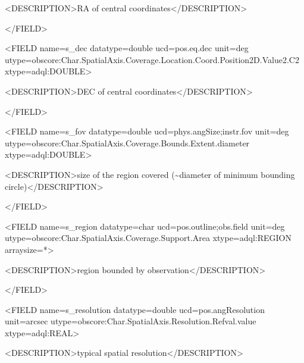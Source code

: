 \documentclass[11pt,a4paper]{ivoa}
\begin{document}
 {\textless}DESCRIPTION{\textgreater}RA of central coordinates{\textless}/DESCRIPTION{\textgreater}

{\textless}/FIELD{\textgreater}

{\textless}FIELD name={\textquotedbl}s\_dec{\textquotedbl} datatype={\textquotedbl}double{\textquotedbl}
ucd={\textquotedbl}pos.eq.dec{\textquotedbl} unit={\textquotedbl}deg{\textquotedbl}
utype={\textquotedbl}obscore:Char.SpatialAxis.Coverage.Location.Coord.Position2D.Value2.C2{\textquotedbl}
xtype={\textquotedbl}adql:DOUBLE{\textquotedbl}{\textgreater}

 {\textless}DESCRIPTION{\textgreater}DEC of central coordinates{\textless}/DESCRIPTION{\textgreater}

{\textless}/FIELD{\textgreater}

{\textless}FIELD name={\textquotedbl}s\_fov{\textquotedbl} datatype={\textquotedbl}double{\textquotedbl}
ucd={\textquotedbl}phys.angSize;instr.fov{\textquotedbl} unit={\textquotedbl}deg{\textquotedbl}
utype={\textquotedbl}obscore:Char.SpatialAxis.Coverage.Bounds.Extent.diameter{\textquotedbl}
xtype={\textquotedbl}adql:DOUBLE{\textquotedbl}{\textgreater}

{\textless}DESCRIPTION{\textgreater}size of the region covered (\~{}diameter of minimum bounding
circle){\textless}/DESCRIPTION{\textgreater}

{\textless}/FIELD{\textgreater}

{\textless}FIELD name={\textquotedbl}s\_region{\textquotedbl} datatype={\textquotedbl}char{\textquotedbl}
ucd={\textquotedbl}pos.outline;obs.field{\textquotedbl} unit={\textquotedbl}deg{\textquotedbl}
utype={\textquotedbl}obscore:Char.SpatialAxis.Coverage.Support.Area{\textquotedbl}
xtype={\textquotedbl}adql:REGION{\textquotedbl} arraysize={\textquotedbl}*{\textquotedbl}{\textgreater}

 {\textless}DESCRIPTION{\textgreater}region bounded by observation{\textless}/DESCRIPTION{\textgreater}

{\textless}/FIELD{\textgreater}

{\textless}FIELD name={\textquotedbl}s\_resolution{\textquotedbl} datatype={\textquotedbl}double{\textquotedbl}
ucd={\textquotedbl}pos.angResolution{\textquotedbl} unit={\textquotedbl}arcsec{\textquotedbl}
utype={\textquotedbl}obscore:Char.SpatialAxis.Resolution.Refval.value{\textquotedbl}
xtype={\textquotedbl}adql:REAL{\textquotedbl}{\textgreater}

{\textless}DESCRIPTION{\textgreater}typical spatial resolution{\textless}/DESCRIPTION{\textgreater}
\end{document}
